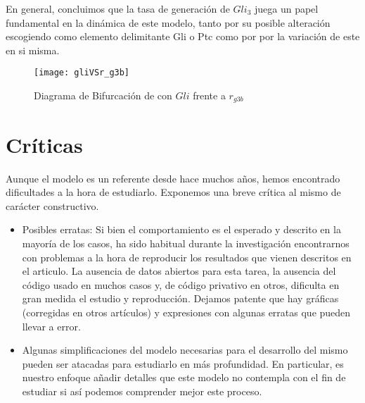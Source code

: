  En general, concluimos que la tasa de generación de $Gli_3$ juega un papel fundamental en la dinámica de este modelo, tanto por su posible alteración escogiendo como elemento delimitante Gli o Ptc como por por la variación de este en si misma. 
 
\begin{figure}[h]
	\texttt{[image: gliVSr\_g3b]}
	\centering
	\caption{Diagrama de Bifurcación de \cite{schaffer} con $Gli$ frente a $r_{g3b}$}
	\label{lai_2}
\end{figure}

\section{Críticas}
Aunque el modelo es un referente desde hace muchos años, hemos encontrado dificultades a la hora de estudiarlo. Exponemos una breve crítica al mismo de carácter constructivo.
\begin{itemize}
	\item Posibles erratas: Si bien el comportamiento es el esperado y descrito en la mayoría de los casos, ha sido habitual durante la investigación encontrarnos con problemas a la hora de reproducir los resultados que vienen descritos en el articulo. 
	La ausencia de datos abiertos para esta tarea, la ausencia del código usado en muchos casos y, de código privativo en otros, dificulta en gran medida el estudio y reproducción. Dejamos patente que hay gráficas (corregidas en otros artículos) y expresiones con algunas erratas que pueden llevar a error.
	
	\item Algunas simplificaciones del modelo necesarias para el desarrollo del mismo pueden ser atacadas para estudiarlo en más profundidad. En particular, es nuestro enfoque añadir detalles que este modelo no contempla con el fin de estudiar si así podemos comprender mejor este proceso. 
\end{itemize}



